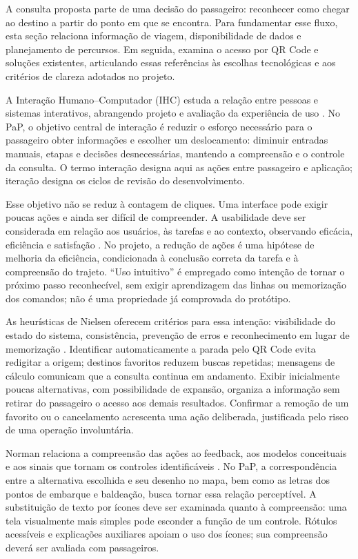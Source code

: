 \documentclass[12pt,oneside,a4paper,brazil,chapter=TITLE]{abntex2}
\begin{document}
A consulta proposta parte de uma decisão do passageiro: reconhecer como chegar ao destino a partir do ponto em que se encontra. Para fundamentar esse fluxo, esta seção relaciona informação de viagem, disponibilidade de dados e planejamento de percursos. Em seguida, examina o acesso por QR Code e soluções existentes, articulando essas referências às escolhas tecnológicas e aos critérios de clareza adotados no projeto.

A Interação Humano--Computador (IHC) estuda a relação entre pessoas e sistemas interativos, abrangendo projeto e avaliação da experiência de uso \citep{barbosa2021}. No PaP, o objetivo central de interação é reduzir o esforço necessário para o passageiro obter informações e escolher um deslocamento: diminuir entradas manuais, etapas e decisões desnecessárias, mantendo a compreensão e o controle da consulta. O termo interação designa aqui as ações entre passageiro e aplicação; iteração designa os ciclos de revisão do desenvolvimento.

Esse objetivo não se reduz à contagem de cliques. Uma interface pode exigir poucas ações e ainda ser difícil de compreender. A usabilidade deve ser considerada em relação aos usuários, às tarefas e ao contexto, observando eficácia, eficiência e satisfação \citep{iso924111}. No projeto, a redução de ações é uma hipótese de melhoria da eficiência, condicionada à conclusão correta da tarefa e à compreensão do trajeto. ``Uso intuitivo'' é empregado como intenção de tornar o próximo passo reconhecível, sem exigir aprendizagem das linhas ou memorização dos comandos; não é uma propriedade já comprovada do protótipo.

As heurísticas de Nielsen oferecem critérios para essa intenção: visibilidade do estado do sistema, consistência, prevenção de erros e reconhecimento em lugar de memorização \citep{nielsen1994}. Identificar automaticamente a parada pelo QR Code evita redigitar a origem; destinos favoritos reduzem buscas repetidas; mensagens de cálculo comunicam que a consulta continua em andamento. Exibir inicialmente poucas alternativas, com possibilidade de expansão, organiza a informação sem retirar do passageiro o acesso aos demais resultados. Confirmar a remoção de um favorito ou o cancelamento acrescenta uma ação deliberada, justificada pelo risco de uma operação involuntária.

Norman relaciona a compreensão das ações ao feedback, aos modelos conceituais e aos sinais que tornam os controles identificáveis \citep{norman2013}. No PaP, a correspondência entre a alternativa escolhida e seu desenho no mapa, bem como as letras dos pontos de embarque e baldeação, busca tornar essa relação perceptível. A substituição de texto por ícones deve ser examinada quanto à compreensão: uma tela visualmente mais simples pode esconder a função de um controle. Rótulos acessíveis e explicações auxiliares apoiam o uso dos ícones; sua compreensão deverá ser avaliada com passageiros.
\end{document}
